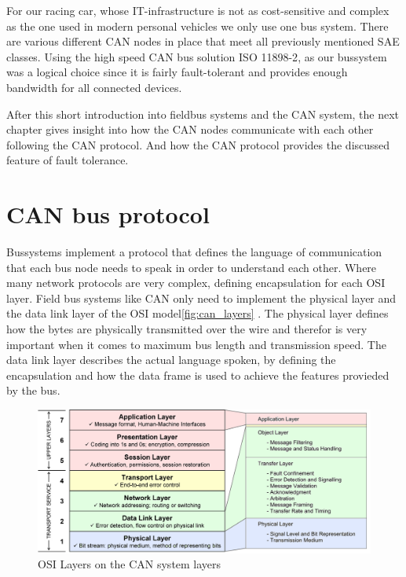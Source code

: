 	For our racing car, whose IT-infrastructure is not as cost-sensitive and
	complex as the one used in modern personal vehicles we only use one bus system.
	There are various different CAN nodes in place that meet all previously
	mentioned SAE classes. Using the high speed CAN bus solution ISO
	11898-2\cite{iso11898-2}, as our bussystem was a logical choice since it is
	fairly fault-tolerant and provides enough bandwidth for all connected devices.
	
	After this short introduction into fieldbus systems and the CAN system, the
	next chapter gives insight into how the CAN nodes communicate with each other
	following the CAN protocol. And how the CAN protocol provides the discussed
	feature of fault tolerance.
	

\section{CAN bus protocol}
Bussystems implement a protocol that defines the language of communication that
each bus node needs to speak in order to understand each other. Where many
network protocols are very complex, defining encapsulation for each OSI layer.
Field bus systems like CAN only need to implement the physical layer and the
data link layer of the OSI model\autoref{fig:can_layers} . The physical layer
defines how the bytes are physically transmitted over the wire and therefor is very important when it
comes to maximum bus length and transmission speed. The data link layer
describes the actual language spoken, by defining the encapsulation and how the
data frame is used to achieve the features provieded by the bus. 

\begin{figure}[htb] \centering
	\includegraphics[width=1\textwidth]{content/pictures/OSI_CAN}
	\caption{OSI Layers on the CAN system layers}
	\label{fig:can_layers}
\end{figure}

